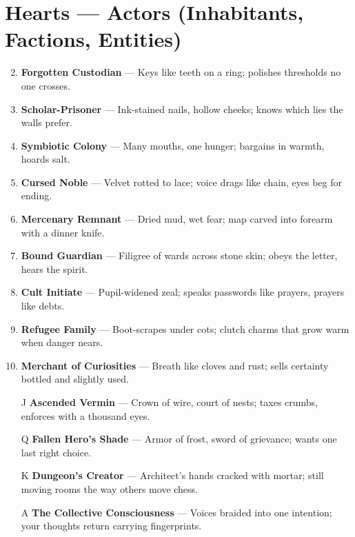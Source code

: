 \section*{Hearts --- Actors (Inhabitants, Factions, Entities)}
\label{sec:dungeon-actors}
\begin{enumerate}
\setcounter{enumi}{1}
\item \textbf{Forgotten Custodian} — Keys like teeth on a ring; polishes thresholds no one crosses.
\item \textbf{Scholar-Prisoner} — Ink-stained nails, hollow cheeks; knows which lies the walls prefer.
\item \textbf{Symbiotic Colony} — Many mouths, one hunger; bargains in warmth, hoards salt.
\item \textbf{Cursed Noble} — Velvet rotted to lace; voice drags like chain, eyes beg for ending.
\item \textbf{Mercenary Remnant} — Dried mud, wet fear; map carved into forearm with a dinner knife.
\item \textbf{Bound Guardian} — Filigree of wards across stone skin; obeys the letter, hears the spirit.
\item \textbf{Cult Initiate} — Pupil-widened zeal; speaks passwords like prayers, prayers like debts.
\item \textbf{Refugee Family} — Boot-scrapes under cots; clutch charms that grow warm when danger nears.
\item \textbf{Merchant of Curiosities} — Breath like cloves and rust; sells certainty bottled and slightly used.
\item[J] \textbf{Ascended Vermin} — Crown of wire, court of nests; taxes crumbs, enforces with a thousand eyes.
\item[Q] \textbf{Fallen Hero’s Shade} — Armor of frost, sword of grievance; wants one last right choice.
\item[K] \textbf{Dungeon’s Creator} — Architect’s hands cracked with mortar; still moving rooms the way others move chess.
\item[A] \textbf{The Collective Consciousness} — Voices braided into one intention; your thoughts return carrying fingerprints.
\end{enumerate}

